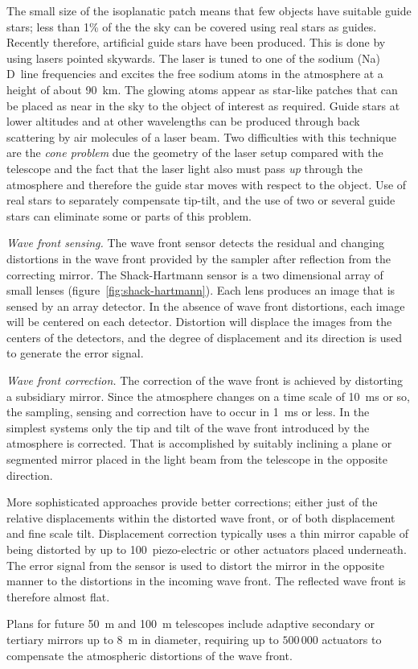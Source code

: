 \documentclass{article}
\begin{document}
The small size of the isoplanatic patch means that few objects have suitable
guide stars; less than 1\% of the the sky can be covered using real stars
as guides. Recently therefore, artificial guide stars have been produced. 
This is done by using lasers pointed skywards. The laser is tuned to one of 
the sodium (Na) D~line frequencies and excites the free sodium atoms in the
atmosphere at a height of about 90~km. The glowing atoms appear as star-like
patches that can be placed as near in the sky to the object of interest as
required. Guide stars at lower altitudes and at other wavelengths can be 
produced through back scattering by air molecules of a laser beam. 
Two difficulties with this technique are the {\it cone problem} due the
geometry of the laser setup compared with the telescope and the fact that
the laser light also must pass {\it up} through the atmosphere and therefore
the guide star moves with respect to the object. Use of real stars to separately
compensate tip-tilt, and the use of two or several guide stars can eliminate
some or parts of this problem.

\noindent
{\it Wave front sensing.} The wave front sensor detects the residual and 
changing distortions in the wave front provided by the sampler after 
reflection from the correcting mirror. The Shack-Hartmann sensor is a two
dimensional array of small lenses (figure~\ref{fig:shack-hartmann}). Each
lens produces an image that is sensed by an array detector. In the absence
of wave front distortions, each image will be centered on each detector.
Distortion will displace the images from the centers of the detectors, and
the degree of displacement and its direction is used to generate the error
signal. 

\noindent
{\it Wave front correction.} The correction of the wave front is achieved
by distorting a subsidiary mirror. Since the atmosphere changes on a time
scale of 10~ms or so, the sampling, sensing and correction have to occur in
1~ms or less. In the simplest systems only the tip and tilt of the wave
front introduced by the atmosphere is corrected. That is accomplished by 
suitably inclining a plane or segmented mirror placed in the light beam
from the telescope in the opposite direction. 

More sophisticated approaches provide better corrections; either just
of the relative displacements within the distorted wave front, or of both
displacement and fine scale tilt. Displacement correction typically uses
a thin mirror capable of being distorted by up to 100~piezo-electric or other
actuators placed underneath. The error signal from the sensor is used to
distort the mirror in the opposite manner to the distortions in the incoming
wave front. The reflected wave front is therefore almost flat.

Plans for future 50~m and 100~m telescopes include adaptive secondary or
tertiary mirrors up to 8~m in diameter, requiring up to $500\,000$ actuators
to compensate the atmospheric distortions of the wave front.
\end{document}
